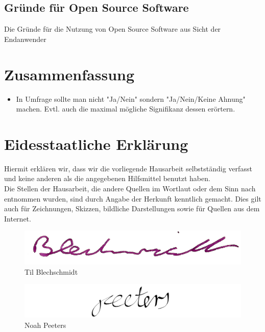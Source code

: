 \documentclass[a4paper]{article}
\begin{document}
        \subsection{Gründe für Open Source Software}
            Die Gründe für die Nutzung von Open Source Software aus Sicht der Endanwender
    
    \section{Zusammenfassung}
        \begin{itemize}
            \item In Umfrage sollte man nicht "Ja/Nein" sondern "Ja/Nein/Keine Ahnung" machen. Evtl. auch die maximal mögliche Signifikanz dessen erörtern.
        \end{itemize}
    
    \clearpage
    \section{Eidesstaatliche Erklärung}
        Hiermit erklären wir, dass wir die vorliegende Hausarbeit selbstständig verfasst und keine anderen als die angegebenen Hilfsmittel benutzt haben.\\
        Die Stellen der Hausarbeit, die andere Quellen im Wortlaut oder dem Sinn nach entnommen wurden, sind durch Angabe der Herkunft kenntlich gemacht. Dies gilt auch für Zeichnungen, Skizzen, bildliche Darstellungen sowie für Quellen aus dem Internet.
        
        
        \begin{figure}[H]
            \centering
            \begin{minipage}{.5\textwidth}
                \centering
                \includegraphics[width=\textwidth]{assets/signature_tilb.png}
                Til Blechschmidt
                \label{fig:test1}
            \end{minipage}%
            \begin{minipage}{.5\textwidth}
                \centering
                \includegraphics[width=\textwidth]{assets/signature_noahp.png}
                Noah Peeters
                \label{fig:test2}
            \end{minipage}
        \end{figure}
        \clearpage
    
\end{document}
